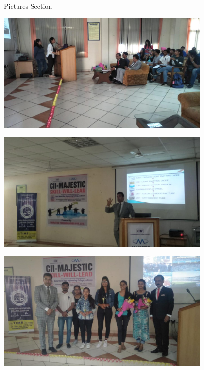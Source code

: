\documentclass[12pt, a4 paper]{article}
\begin{document}
\begin{center}
\Huge Pictures Section

\medskip

\includegraphics[height=6cm]{image1.jpg}

\medskip

\includegraphics[height=6cm]{image3.jpg}

\medskip

\includegraphics[height=6cm]{image4.jpg}

\end{center}

\newpage
\end{document}
